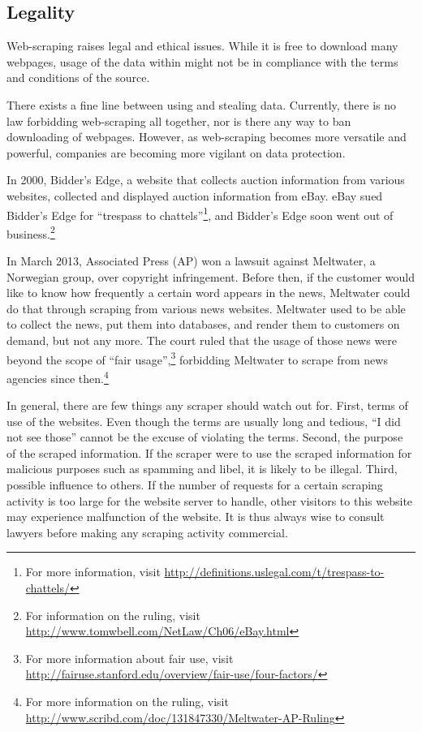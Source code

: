 \documentclass[12pt]{report}
\begin{document}
\subsection{Legality}

Web-scraping raises legal and ethical issues. While it is free to download many webpages, usage of the data within might not be in compliance with the terms and conditions of the source. 

There exists a fine line between using and stealing data. Currently, there is no law forbidding web-scraping all together, nor is there any way to ban downloading of webpages. However, as web-scraping becomes more versatile and powerful, companies are becoming more vigilant on data protection. 

In 2000, Bidder's Edge, a website that collects auction information from various websites, collected and displayed auction information from eBay. eBay sued Bidder's Edge for ``trespass to chattels''\footnote{For more information, visit \url{http://definitions.uslegal.com/t/trespass-to-chattels/}}, and Bidder's Edge soon went out of business.\footnote{For information on the ruling, visit \url{http://www.tomwbell.com/NetLaw/Ch06/eBay.html}}

In March 2013, Associated Press (AP) won a lawsuit against Meltwater, a Norwegian group, over copyright infringement. Before then, if the customer would like to know how frequently a certain word appears in the news, Meltwater could do that through scraping from various news websites. Meltwater used to be able to collect the news, put them into databases, and render them to customers on demand, but not any more. The court ruled that the usage of those news were beyond the scope of ``fair usage'',\footnote{For more information about fair use, visit \url{http://fairuse.stanford.edu/overview/fair-use/four-factors/}} forbidding Meltwater to scrape from news agencies since then.\footnote{For more information on the ruling, visit \url{http://www.scribd.com/doc/131847330/Meltwater-AP-Ruling}}

In general, there are few things any scraper should watch out for. First, terms of use of the websites. Even though the terms are usually long and tedious, ``I did not see those'' cannot be the excuse of violating the terms. Second, the purpose of the scraped information. If the scraper were to use the scraped information for malicious purposes such as spamming and libel, it is likely to be illegal. Third, possible influence to others. If the number of requests for a certain scraping activity is too large for the website server to handle, other visitors to this website may experience malfunction of the website. It is thus always wise to consult lawyers before making any scraping activity commercial.
\end{document}
